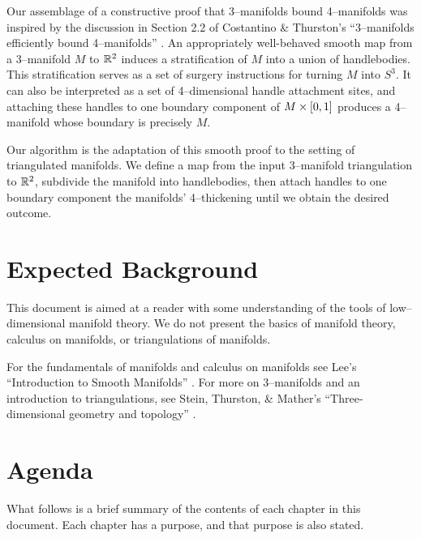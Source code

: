 Our assemblage of a constructive proof that 3--manifolds bound 4--manifolds was inspired by the discussion in Section 2.2 of Costantino \& Thurston's ``3--manifolds efficiently bound 4--manifolds'' \cite{CostThur08}.
An appropriately well-behaved smooth map from a 3--manifold $M$ to $\mathbb{R}^2$ induces a stratification of $M$ into a union of handlebodies.
This stratification serves as a set of surgery instructions for turning $M$ into $S^3$.
It can also be interpreted as a set of 4--dimensional handle attachment sites, and attaching these handles to one boundary component of $M\times[0,1]$ produces a 4--manifold whose boundary is precisely $M$.

Our algorithm is the adaptation of this smooth proof to the setting of triangulated manifolds.
We define a map from the input 3--manifold triangulation to $\mathbb{R}^2$, subdivide the manifold into handlebodies, then attach handles to one boundary component the manifolds' 4--thickening until we obtain the desired outcome.

\section{Expected Background}

This document is aimed at a reader with some understanding of the tools of low--dimensional manifold theory.
We do not present the basics of manifold theory, calculus on manifolds, or triangulations of manifolds.

For the fundamentals of manifolds and calculus on manifolds see Lee's ``Introduction to Smooth Manifolds'' \cite{Lee00}.
For more on 3--manifolds and an introduction to triangulations, see Stein, Thurston, \& Mather's ``Three-dimensional geometry and topology'' \cite{thurston1979geometry}.

\section{Agenda}

What follows is a brief summary of the contents of each chapter in this document.
Each chapter has a purpose, and that purpose is also stated.

